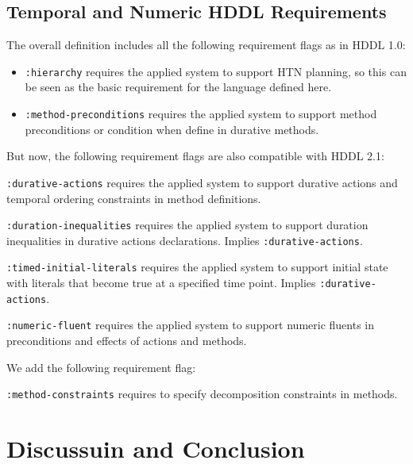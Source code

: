 \documentclass[letterpaper]{article} %
\begin{document}
\subsection{Temporal and Numeric HDDL Requirements}
\label{Sec:Requirements}
The overall definition includes all the following requirement flags as in HDDL 1.0:
\begin{itemize}
 \item \verb+:hierarchy+ requires the applied system to support HTN planning, so this can be seen as the basic requirement for the language defined here.
 \item \verb+:method-preconditions+ requires the applied system to support method preconditions or condition when define in durative methods.
\end{itemize}
But now, the following requirement flags are also compatible with HDDL 2.1:
\begin{description}
 \item \verb+:durative-actions+ requires the applied system to support durative actions and temporal ordering constraints in method definitions.
 \item \verb+:duration-inequalities+ requires the applied system to support duration inequalities in durative actions declarations. Implies \verb+:durative-actions+.
 \item \verb+:timed-initial-literals+ requires the applied system to support initial state with literals that become true at a specified time point. Implies \verb+:durative-actions+.
 \item \verb+:numeric-fluent+ requires the applied system to support numeric fluents in preconditions and effects of actions and methods.
 \end{description}
 We add the following requirement flag:
\begin{description}
\item \verb+:method-constraints+ requires to specify decomposition constraints in methods.
 \end{description}

\section{Discussuin and Conclusion}
\label{sec:conclusion}

\end{document}
